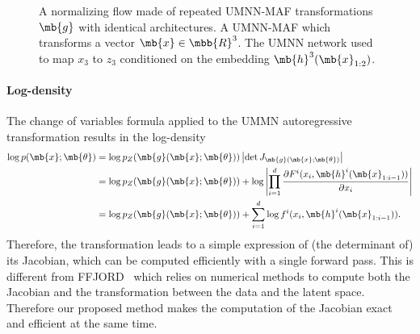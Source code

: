 \begin{figure}
\caption{ A normalizing flow made of repeated UMNN-MAF transformations $\mb{g}$ with identical architectures.  A UMNN-MAF which transforms a vector $\mb{x}\in \mbb{R}^3$.  The UMNN network used to map $x_3$ to $z_3$ conditioned on the embedding $\mb{h}^3(\mb{x}_{1:2})$.}
\label{fig:architecture}
\end{figure}
\vspace{-1em}



\paragraph{Log-density}
The change of variables formula applied to the UMMN autoregressive transformation results in the log-density
\begin{align}
    \log p(\mb{x}; \mb{\theta}) &= \log p_Z(\mb{g}(\mb{x}; \mb{\theta}))  \left|\det J_{\mb{g}(\mb{x};\mb{\theta})} \right|  \nonumber\\
    &=\log p_Z(\mb{g}(\mb{x}; \mb{\theta}))  + \log\left|\prod^d_{i=1} \frac{\partial F^i(x_i, \mb{h}^i(\mb{x}_{1 : i-1}))}{\partial x_i}\right| \nonumber\\
    &=\log p_Z(\mb{g}(\mb{x}; \mb{\theta}))   + \sum^d_{i=1} \log f^i(x_i, \mb{h}^i(\mb{x}_{1 : i-1})).
\end{align}
Therefore, the transformation leads to a simple expression of (the determinant of) its Jacobian, which can be  computed efficiently with a single forward pass. This is different from FFJORD~\citep{grathwohl_ffjord_2018} which relies on numerical methods to compute both the Jacobian and the transformation between the data and the latent space. Therefore our proposed method makes the computation of the Jacobian exact and efficient at the same time.

